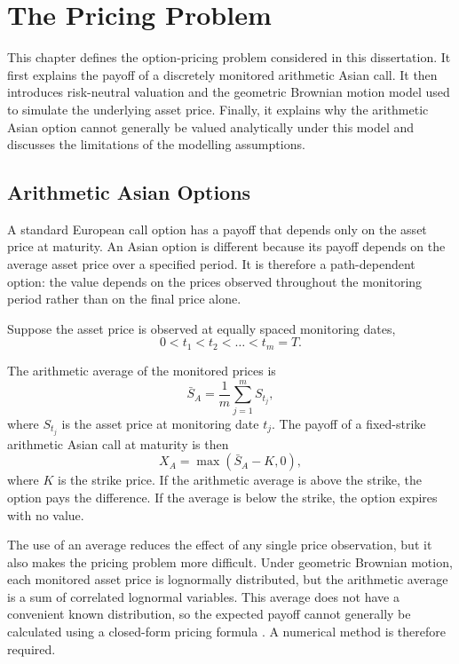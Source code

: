 \chapter{The Pricing Problem}
\label{chap:pricing-problem}

This chapter defines the option-pricing problem considered in this dissertation. It first explains the payoff of a discretely monitored arithmetic Asian call. It then introduces risk-neutral valuation and the geometric Brownian motion model used to simulate the underlying asset price. Finally, it explains why the arithmetic Asian option cannot generally be valued analytically under this model and discusses the limitations of the modelling assumptions.

\section{Arithmetic Asian Options}
\label{sec:arithmetic-asian-options}

A standard European call option has a payoff that depends only on the asset price at maturity. An Asian option is different because its payoff depends on the average asset price over a specified period. It is therefore a path-dependent option: the value depends on the prices observed throughout the monitoring period rather than on the final price alone.

Suppose the asset price is observed at equally spaced monitoring dates,
\[
0<t_1<t_2<\dots<t_m=T.
\]

The arithmetic average of the monitored prices is
\[
\bar{S}_A
=
\frac{1}{m}
\sum_{j=1}^{m}S_{t_j},
\]
where \(S_{t_j}\) is the asset price at monitoring date \(t_j\). The payoff of a fixed-strike arithmetic Asian call at maturity is then
\[
X_A
=
\max\left(\bar{S}_A-K,0\right),
\]
where \(K\) is the strike price. If the arithmetic average is above the strike, the option pays the difference. If the average is below the strike, the option expires with no value.

The use of an average reduces the effect of any single price observation, but it also makes the pricing problem more difficult. Under geometric Brownian motion, each monitored asset price is lognormally distributed, but the arithmetic average is a sum of correlated lognormal variables. This average does not have a convenient known distribution, so the expected payoff cannot generally be calculated using a closed-form pricing formula \parencite{kemna1990,glasserman2004}. A numerical method is therefore required.

